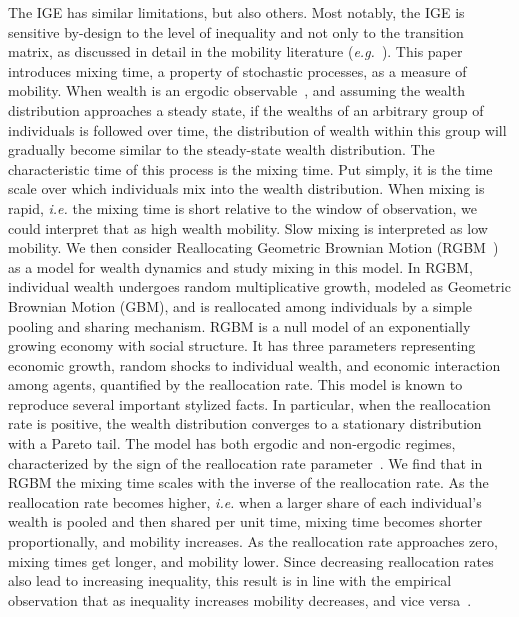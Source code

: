 \documentclass[11pt]{article}
\newcommand{\ie}{{\it i.e.}\xspace}
\newcommand{\eg}{{\it e.g.}\xspace}
\numberwithin{equation}{section}
\begin{document}
The IGE has similar limitations, but also others. Most notably, the IGE is sensitive by-design to the level of inequality and not only to the transition matrix, as discussed in detail in the mobility literature (\eg~\citet{chettyETAL2014}).
This paper introduces mixing time, a property of stochastic processes, as a measure of mobility. When wealth is an ergodic observable~\citep{PetersAdamou2018c}, and assuming the wealth distribution approaches a steady state, if the wealths of an arbitrary group of individuals is followed over time, the distribution of wealth within this group will gradually become similar to the steady-state wealth distribution. The characteristic time of this process is the mixing time. Put simply, it is the time scale over which individuals mix into the wealth distribution. When mixing is rapid, \ie the mixing time is short relative to the window of observation, we could interpret that as high wealth mobility. Slow mixing is interpreted as low mobility.
We then consider Reallocating Geometric Brownian Motion (RGBM~\citep{MarsiliMaslovZhang1998,LiuSerota2017,BermanPetersAdamou2019}) as a model for wealth dynamics and study mixing in this model. In RGBM, individual wealth undergoes random multiplicative growth, modeled as Geometric Brownian Motion (GBM), and is reallocated among individuals by a simple pooling and sharing mechanism. RGBM is a null model of an exponentially growing economy with social structure. It has three parameters representing economic growth, random shocks to individual wealth, and economic interaction among agents, quantified by the reallocation rate. This model is known to reproduce several important stylized facts. In particular, when the reallocation rate is positive, the wealth distribution converges to a stationary distribution with a Pareto tail. The model has both ergodic and non-ergodic regimes, characterized by the sign of the reallocation rate parameter~\citep{BermanPetersAdamou2019}.
We find that in RGBM the mixing time scales with the inverse of the reallocation rate. As the reallocation rate becomes higher, \ie when a larger share of each individual's wealth is pooled and then shared per unit time, mixing time becomes shorter proportionally, and mobility increases. As the reallocation rate approaches zero, mixing times get longer, and mobility lower. Since decreasing reallocation rates also lead to increasing inequality, this result is in line with the empirical observation that as inequality increases mobility decreases, and vice versa~\citep{corak2013}.
\end{document}
